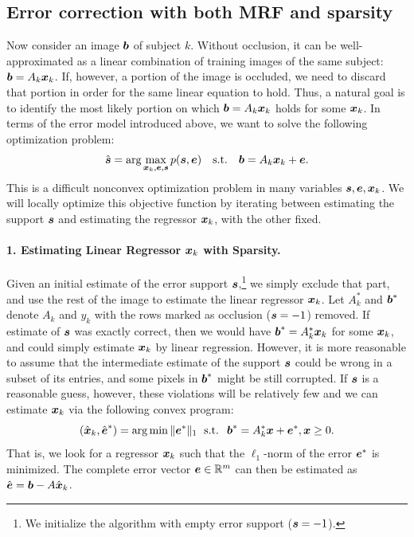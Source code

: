 \subsection{Error correction with both MRF and sparsity}
Now consider an image $\boldsymbol{b}$ of subject $k$. Without occlusion, it can be well-approximated as a linear combination of training images of the same subject: $\boldsymbol{b} = A_k {\boldsymbol{x}}_k$. If, however, a portion of the image is occluded, we need to discard that portion in order for the same linear equation to hold. Thus, a natural goal is to identify the most likely portion  on which $\boldsymbol{b} = A_k {\boldsymbol{x}}_k$ holds for some ${\boldsymbol{x}}_k$. In terms of the error model introduced above, we want to solve the following optimization problem:
\begin{equation}
\hat {\boldsymbol{s}} = \mbox{arg}\max_{{\boldsymbol{x}}_k,\boldsymbol{e},\boldsymbol{s}} p(\boldsymbol{s}, \boldsymbol{e}) \quad \mbox{s.t.} \quad \boldsymbol{b} = A_k {\boldsymbol{x}}_k + \boldsymbol{e}.
\end{equation}
This is a difficult nonconvex optimization problem in many variables $\boldsymbol{s}, \boldsymbol{e}, {\boldsymbol{x}}_k$. We will locally optimize this objective function by iterating between estimating the support $\boldsymbol{s}$ and estimating the regressor ${\boldsymbol{x}}_k$, with the other fixed.

\paragraph{1. Estimating Linear Regressor ${\boldsymbol{x}}_k$ with Sparsity.}
Given an initial estimate of the error support $\boldsymbol{s}$,\footnote{We initialize the algorithm with empty error support ($\boldsymbol{s} = -1$).} we simply exclude that part, and use the rest of the image to estimate the linear regressor ${\boldsymbol{x}}_k$. Let $A_k^*$ and $\boldsymbol{b}^*$ denote $A_k$ and $y_k$ with the rows marked as occlusion ($\boldsymbol{s} = -1$) removed.
If estimate of $\boldsymbol{s}$ was exactly correct, then we would have $\boldsymbol{b}^* = A_k^* {\boldsymbol{x}}_k$ for some ${\boldsymbol{x}}_k$, and could simply estimate ${\boldsymbol{x}}_k$ by linear regression. However, it is more reasonable to assume that the intermediate estimate of the support $\boldsymbol{s}$ could be wrong in a subset of its entries, and some pixels in $\boldsymbol{b}^*$ might be still corrupted. If $\boldsymbol{s}$ is a reasonable guess, however, these violations will be relatively few and we can estimate ${\boldsymbol{x}}_k$ via the following convex program:
\begin{equation}
(\hat{{\boldsymbol{x}}}_k,\hat{\boldsymbol{e}}^*) = \arg\min \|\boldsymbol{e}^*\|_1  \; \textup{ s.t. } \; \boldsymbol{b}^* = A_k^*{\boldsymbol{x}}+\boldsymbol{e}^*, {\boldsymbol{x}}\geq
0.
\end{equation}
That is, we look for a regressor ${\boldsymbol{x}}_k$ such that the $\ell_1$-norm of the error $\boldsymbol{e}^*$ is minimized. The complete error vector $\boldsymbol{e} \in \mathbb R^m$ can then be estimated as $\hat {\boldsymbol{e}} = \boldsymbol{b} - A \hat{{\boldsymbol{x}}}_k$.

